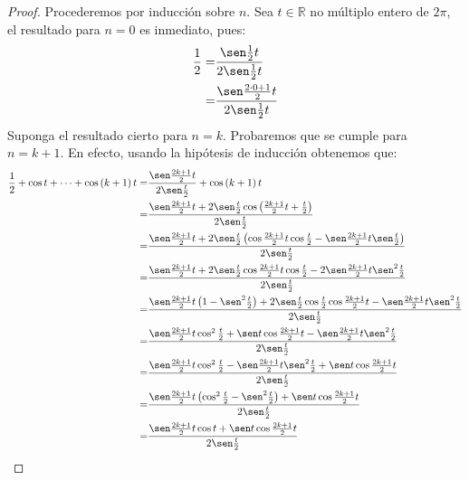 \documentclass[12pt]{article}
\begin{document}
\begin{enumerate}
    \begin{proof}
        Procederemos por inducción sobre $n$. Sea $t\in\mathbb{R}$ no múltiplo entero de $2\pi$, el resultado para $n=0$ es inmediato, pues:
        \begin{equation*}
            \begin{split}
                \frac{1}{2}=&\frac{\sen \frac{1}{2}t}{2\sen \frac{1}{2}t}\\
                =&\frac{\sen \frac{2\cdot 0 + 1}{2}t}{2\sen \frac{1}{2}t}\\
            \end{split}
        \end{equation*}
        Suponga el resultado cierto para $n=k$. Probaremos que se cumple para $n=k+1$. En efecto, usando la hipótesis de inducción obtenemos que:
        \begin{equation*}
            \begin{split}
                \frac{1}{2}+\cos t+\cdots+\cos \left(k+1\right)t=&\frac{\sen \frac{2k+1}{2}t}{2\sen \frac{t}{2}}+\cos \left(k+1\right)t\\
                =&\frac{\sen \frac{2k+1}{2}t+2\sen \frac{t}{2} \cos \left(\frac{2k+1}{2}t+\frac{t}{2}\right)}{2\sen \frac{t}{2}}\\
                =&\frac{\sen \frac{2k+1}{2}t+2\sen \frac{t}{2}\left(\cos \frac{2k+1}{2}t\cos \frac{t}{2}-\sen\frac{2k+1}{2}t\sen \frac{t}{2}\right)}{2\sen \frac{t}{2}}\\
                =&\frac{\sen \frac{2k+1}{2}t+2\sen \frac{t}{2}\cos \frac{2k+1}{2}t\cos \frac{t}{2}-2\sen\frac{2k+1}{2}t\sen^2 \frac{t}{2}}{2\sen \frac{t}{2}}\\
                =&\frac{\sen\frac{2k+1}{2}t\left(1-\sen^2\frac{t}{2}\right)+2\sen\frac{t}{2}\cos\frac{t}{2}\cos\frac{2k+1}{2}t-\sen\frac{2k+1}{2}t\sen^2\frac{t}{2}}{2\sen\frac{t}{2}}\\
                =&\frac{\sen\frac{2k+1}{2}t\cos^2\frac{t}{2}+\sen t\cos\frac{2k+1}{2}t-\sen\frac{2k+1}{2}t\sen^2\frac{t}{2}}{2\sen\frac{t}{2}}\\
                =&\frac{\sen\frac{2k+1}{2}t\cos^2\frac{t}{2}-\sen\frac{2k+1}{2}t\sen^2\frac{t}{2}+\sen t\cos\frac{2k+1}{2}t}{2\sen\frac{t}{2}}\\
                =&\frac{\sen\frac{2k+1}{2}t\left(\cos^2\frac{t}{2}-\sen^2\frac{t}{2}\right)+\sen t\cos\frac{2k+1}{2}t}{2\sen\frac{t}{2}}\\
                =&\frac{\sen\frac{2k+1}{2}t\cos t+\sen t\cos\frac{2k+1}{2}t}{2\sen\frac{t}{2}}\\

\end{split}
\end{equation*}
\end{proof}
\end{enumerate}
\end{document}
